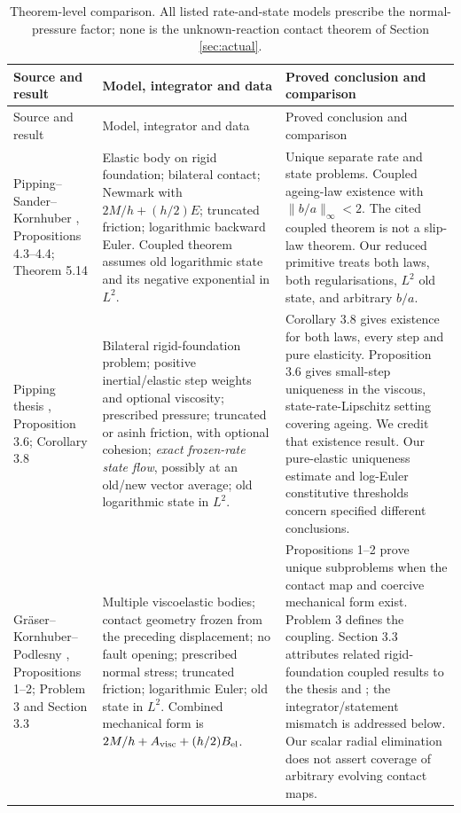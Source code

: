 \documentclass[11pt,a4paper]{article}
\theoremstyle{definition}\newtheorem{definition}[theorem]{Definition}
\theoremstyle{remark}\newtheorem{remark}[theorem]{Remark}
\numberwithin{equation}{section}
\begin{document}
\begingroup\small
\setlength{\tabcolsep}{4pt}
\begin{longtable}{>{\raggedright\arraybackslash}p{.20\linewidth}>{\raggedright\arraybackslash}p{.35\linewidth}>{\raggedright\arraybackslash}p{.39\linewidth}}
\caption{Theorem-level comparison. All listed rate-and-state models prescribe the normal-pressure factor; none is the unknown-reaction contact theorem of Section \ref{sec:actual}.}\label{tab:priorart}\\
\toprule
Source and result & Model, integrator and data & Proved conclusion and comparison\\\midrule\endfirsthead
\toprule Source and result & Model, integrator and data & Proved conclusion and comparison\\\midrule\endhead
\bottomrule\endfoot
Pipping--Sander--Kornhuber \cite{PSK}, Propositions 4.3--4.4; Theorem 5.14
& Elastic body on rigid foundation; bilateral contact; Newmark with $2M/h+(h/2)E$; truncated friction; logarithmic backward Euler. Coupled theorem assumes old logarithmic state and its negative exponential in $L^2$.
& Unique separate rate and state problems. Coupled ageing-law existence with $\|b/a\|_\infty<2$. The cited coupled theorem is not a slip-law theorem. Our reduced primitive treats both laws, both regularisations, $L^2$ old state, and arbitrary $b/a$.\\[5pt]
Pipping thesis \cite{PippingThesis}, Proposition 3.6; Corollary 3.8
& Bilateral rigid-foundation problem; positive inertial/elastic step weights and optional viscosity; prescribed pressure; truncated or asinh friction, with optional cohesion; \emph{exact frozen-rate state flow}, possibly at an old/new vector average; old logarithmic state in $L^2$.
& Corollary 3.8 gives existence for both laws, every step and pure elasticity. Proposition 3.6 gives small-step uniqueness in the viscous, state-rate-Lipschitz setting covering ageing. We credit that existence result. Our pure-elastic uniqueness estimate and log-Euler constitutive thresholds concern specified different conclusions.\\[5pt]
Gr\"aser--Kornhuber--Podlesny \cite{GKP}, Propositions 1--2; Problem 3 and Section 3.3
& Multiple viscoelastic bodies; contact geometry frozen from the preceding displacement; no fault opening; prescribed normal stress; truncated friction; logarithmic Euler; old state in $L^2$. Combined mechanical form is $2M/h+A_{\rm visc}+(h/2)B_{\rm el}$.
& Propositions 1--2 prove unique subproblems when the contact map and coercive mechanical form exist. Problem 3 defines the coupling. Section 3.3 attributes related rigid-foundation coupled results to the thesis and \cite{PSK}; the integrator/statement mismatch is addressed below. Our scalar radial elimination does not assert coverage of arbitrary evolving contact maps.\\[5pt]

\end{longtable}
\end{document}
